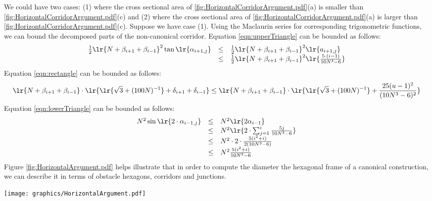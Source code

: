 We could have two cases: (1) where the cross sectional area of \ref{fig:HorizontalCorridorArgument.pdf}(a) is smaller than \ref{fig:HorizontalCorridorArgument.pdf}(c) and (2) where the cross sectional area of \ref{fig:HorizontalCorridorArgument.pdf}(a) is larger than \ref{fig:HorizontalCorridorArgument.pdf}(c).
Suppose we have case (1). Using the Maclaurin series for corresponding trigonometric functions, we can bound the decomposed parts of the non-canonical corridor.
Equation \ref{eqn:upperTriangle} can be bounded as follows:
\begin{equation}\label{eqn:upperTriangleBound}
\begin{array}{rcl}
\frac{1}{2}\lr{N+\beta_{i+1} + \beta_{i-1}}^2 \tan \lr{\alpha_{i+1,j}} &\leq& \frac{1}{2}\lr{N+\beta_{i+1} + \beta_{i-1}}^2 \lr{a_{i+1,j}}\\
&\leq& \frac{1}{2}\lr{N+\beta_{i+1} + \beta_{i-1}}^2 \lr{\frac{5 \cdot (i-1)}{10N^3 - 6}}
\end{array}
\end{equation}
Equation \ref{eqn:rectangle} can be bounded as follows:
\begin{equation}\label{eqn:rectangleBound}
\lr{N + \beta_{i+1} + \beta_{i-1}} \cdot \lr{\lr{\sqrt{3} + (100N)^{-1}} + \delta_{i+1} + \delta_{i-1}}\leq\lr{N + \beta_{i+1} + \beta_{i-1}} \cdot \lr{\lr{\sqrt{3} + (100N)^{-1}} + \frac{25(u-1)^2}{(10N^3 - 6)^2}}
\end{equation}
Equation \ref{eqn:lowerTriangle} can be bounded as follows:
\begin{equation}\label{eqn:lowerTriangleBound}
\begin{array}{rcl}
N^2 \sin \lr{2 \cdot \alpha_{i-1,j}}&\leq&N^2 \lr{2 \alpha_{i-1}}\\
&\leq&N^2 \lr{2 \cdot \sum_{j=1}^i \frac{5j}{10N^3-6}}\\
&\leq&N^2 \cdot 2 \cdot \frac{5 (i^2 + i)}{2(10N^3-6)}\\
&\leq&N^2 \frac{5 (i^2 + i)}{10N^3-6}
\end{array}
\end{equation}
Figure \ref{fig:HorizontalArgument.pdf} helps illustrate that in order to compute the diameter the hexagonal frame of a canonical construction, we can describe it in terms of obstacle hexagons, corridors and junctions.

\begin{minipage}{\linewidth}
\begin{center}
\texttt{[image: graphics/HorizontalArgument.pdf]}
\label{fig:HorizontalArgument.pdf}
\end{center}
\end{minipage}

